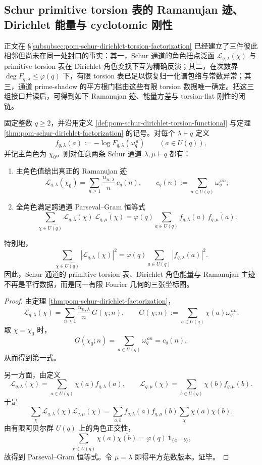 \subsection{Schur primitive torsion 表的 Ramanujan 迹、Dirichlet 能量与 cyclotomic 刚性}

正文在 \S\ref{subsubsec:pom-schur-dirichlet-torsion-factorization} 已经建立了三件彼此相邻但尚未在同一处封口的事实：其一，Schur 通道的角色扭点泛函 \(\mathcal L_{q,\lambda}(\chi)\) 与 primitive torsion 表在 Dirichlet 角色变换下互为精确反演；其二，在次数界 \(\deg F_{q,\lambda}\le \varphi(q)\) 下，有限 torsion 表已足以恢复归一化谱包络与常数异常；其三，通道 prime-shadow 的平方根门槛由这些有限 torsion 数据唯一确定。把这三组接口并读后，可得到如下 Ramanujan 迹、能量方差与 torsion-flat 刚性的闭链。

\begin{theorem}\label{thm:derived-schur-dirichlet-ramanujan-parseval}
固定整数 \(q\ge 2\)，并沿用定义 \ref{def:pom-schur-dirichlet-torsion-functional} 与定理 \ref{thm:pom-schur-dirichlet-factorization} 的记号。对每个 \(\lambda\vdash q\) 定义
\[
f_{q,\lambda}(a):=-\log F_{q,\lambda}(\omega_q^{\,a})
\qquad (a\in U(q)),
\]
并记主角色为 \(\chi_0\)。则对任意两条 Schur 通道 \(\lambda,\mu\vdash q\) 都有：
\begin{enumerate}
\normalfont
  \item 主角色值给出真正的 Ramanujan 迹
  \[
  \mathcal L_{q,\lambda}(\chi_0)
  =
  \sum_{n\ge 1}\frac{u_{n,\lambda}}{n}\,c_q(n),
  \qquad
  c_q(n):=\sum_{a\in U(q)}\omega_q^{\,an};
  \]
  \item 全角色满足跨通道 Parseval--Gram 恒等式
  \[
  \sum_{\chi\in\widehat{U(q)}}\mathcal L_{q,\lambda}(\chi)\,
  \overline{\mathcal L_{q,\mu}(\chi)}
  =
  \varphi(q)\sum_{a\in U(q)}f_{q,\lambda}(a)\,\overline{f_{q,\mu}(a)}.
  \]
\end{enumerate}
特别地，
\[
\sum_{\chi\in\widehat{U(q)}}|\mathcal L_{q,\lambda}(\chi)|^2
=
\varphi(q)\sum_{a\in U(q)}|f_{q,\lambda}(a)|^2.
\]
因此，Schur 通道的 primitive torsion 表、Dirichlet 角色能量与 Ramanujan 主迹不再是平行数据，而是同一有限 Fourier 几何的三张坐标图。
\end{theorem}

\begin{proof}
由定理 \ref{thm:pom-schur-dirichlet-factorization}，
\[
\mathcal L_{q,\lambda}(\chi)
=
\sum_{n\ge 1}\frac{u_{n,\lambda}}{n}\,G(\chi;n),
\qquad
G(\chi;n):=\sum_{a\in U(q)}\chi(a)\omega_q^{\,an}.
\]
取 \(\chi=\chi_0\) 时，
\[
G(\chi_0;n)=\sum_{a\in U(q)}\omega_q^{\,an}=c_q(n),
\]
从而得到第一式。

另一方面，由定义
\[
\mathcal L_{q,\lambda}(\chi)=\sum_{a\in U(q)}\chi(a)f_{q,\lambda}(a),
\qquad
\mathcal L_{q,\mu}(\chi)=\sum_{b\in U(q)}\chi(b)f_{q,\mu}(b).
\]
于是
\[
\sum_{\chi}\mathcal L_{q,\lambda}(\chi)\overline{\mathcal L_{q,\mu}(\chi)}
=
\sum_{a,b}f_{q,\lambda}(a)\overline{f_{q,\mu}(b)}
\sum_{\chi}\chi(a)\overline{\chi(b)}.
\]
由有限阿贝尔群 \(U(q)\) 上的角色正交性，
\[
\sum_{\chi\in\widehat{U(q)}}\chi(a)\overline{\chi(b)}
=
\varphi(q)\,\mathbf 1_{\{a=b\}},
\]
故得到 Parseval--Gram 恒等式。令 \(\mu=\lambda\) 即得平方范数版本。证毕。
\end{proof}

